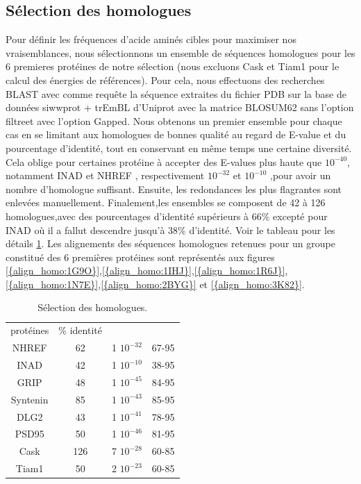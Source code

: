 \subsection{Sélection des homologues}


Pour définir les fréquences d'acide aminés cibles pour maximiser nos vraisemblances, nous sélectionnons un ensemble de séquences homologues pour les 6 premieres protéines de notre sélection (nous excluons Cask et Tiam1 pour le calcul des énergies de références). Pour cela, nous effectuons des recherches BLAST avec comme requête la séquence extraites du fichier PDB sur la base de données \og siwwprot + trEmBL \fg d'Uniprot avec la matrice BLOSUM62 sans l'option \og filtre\fg et avec l'option \og Gapped\fg. Nous obtenons un premier ensemble pour chaque cas en se limitant aux homologues de bonnes qualité au regard de E-value et du pourcentage d'identité, tout en conservant  en même temps une certaine diversité. Cela oblige pour certaines protéine à accepter des E-values plus haute que  $10^{-40}$, notamment INAD et NHREF , respectivement $10^{-32}$ et $10^{-10}$ ,pour avoir un nombre d'homologue suffisant. Ensuite, les redondances les plus flagrantes sont enlevées manuellement. Finalement,les ensembles se composent de 42 à 126 homologues,avec des pourcentages d'identité supérieurs à 66\% excepté pour INAD où il a fallut descendre jusqu'à 38\% d'identité. Voir le tableau pour les détails \ref{tab:select_homo}. Les alignements des séquences homologues retenues pour un groupe constitué des 6 premières protéines sont représentés aux figures \ref{{align_homo:1G9O}},\ref{{align_homo:1IHJ}},\ref{{align_homo:1R6J}},\ref{{align_homo:1N7E}},\ref{{align_homo:2BYG}} et \ref{{align_homo:3K82}}.


    \begin{table}[!htbp]
      \centering
      \caption{Sélection des homologues.}
      \begin{tabular}{cccc}

        \toprule
        protéines & \% identité & &\\
        \cmidrule{1-4}
     NHREF  & 62  &    1 $10^{-32}$  &  67-95 \\
     INAD  & 42  &    1 $10^{-10}$  &  38-95 \\
     GRIP  & 48  &    1 $10^{-45}$  &  84-95 \\
     Syntenin  & 85  &    1 $10^{-43}$  &  85-95 \\
     DLG2  & 43  &    1 $10^{-41}$  &  78-95 \\
     PSD95  & 50  &    1 $10^{-46}$  &  81-95 \\
     \cmidrule{1-4}
     Cask  & 126 &    7 $10^{-28}$  &  60-85 \\
     Tiam1 & 50  &    2 $10^{-23}$  &  60-85 \\

        \bottomrule

      \end{tabular}      
      \label{tab:select_homo}      
    \end{table}

